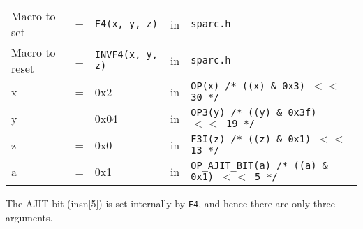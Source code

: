 \begin{enumerate}
  \begin{tabular}[h]{lclcl}
    Macro to set  &=& \texttt{F4(x, y, z)} &in& \texttt{sparc.h}     \\
    Macro to reset  &=& \texttt{INVF4(x, y, z)} &in& \texttt{sparc.h}     \\
    x &=& 0x2      &in& \texttt{OP(x)  /* ((x) \& 0x3)  $<<$ 30 */} \\
    y &=& 0x04     &in& \texttt{OP3(y) /* ((y) \& 0x3f) $<<$ 19 */} \\
    z &=& 0x0      &in& \texttt{F3I(z) /* ((z) \& 0x1)  $<<$ 13 */} \\
    a &=& 0x1      &in& \texttt{OP\_AJIT\_BIT(a) /* ((a) \& 0x1)  $<<$ 5 */}
  \end{tabular}

  The AJIT bit  (insn[5]) is set internally by  \texttt{F4}, and hence
  there are only three arguments.


\end{enumerate}
